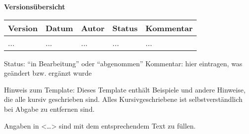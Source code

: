 
{\textbf{Versionsübersicht}}\\[2ex]

\begin{longtable}{|m{1.78cm}|m{1.59cm}|m{2.86cm}|m{1.9cm}|m{5.25cm}|}

  \hline                                              %

  \textbf{Version}  &    \textbf{Datum}  &    \textbf{Autor}  &
  \textbf{Status}   &    \textbf{Kommentar}  \\  %
  \hline                                              %

  ...    &    ...    &    ...    &    ...    &    ...\\       %
  \hline                                              %

\end{longtable}
Status: "`in Bearbeitung"' oder "`abgenommen"'
Kommentar: hier eintragen, was geändert bzw. ergänzt wurde



Hinweis zum Template:
Dieses Template enthält Beispiele und andere Hinweise, die alle kursiv
geschrieben sind. Alles Kursivgeschriebene ist selbstverständlich bei Abgabe zu
entfernen sind.

Angaben in <\ldots> sind mit dem entsprechendem Text zu füllen.

